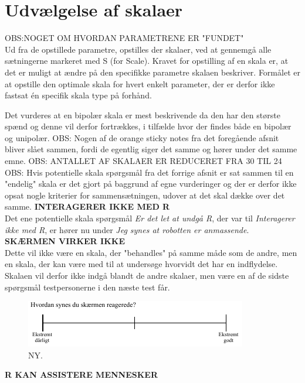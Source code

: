 \section{Udvælgelse af skalaer}
\label{ParametreDatabehandlingSkalaer}
%
OBS:NOGET OM HVORDAN PARAMETRENE ER "FUNDET" \\
Ud fra de opstillede parametre, opstilles der skalaer, ved at gennemgå alle sætningerne markeret med S (for Scale). Kravet for opstilling af en skala er, at det er muligt at ændre på den specifikke parametre skalaen beskriver. Formålet er at opstille den optimale skala for hvert enkelt parameter, der er derfor ikke fastsat én specifik skala type på forhånd. 

Det vurderes at en bipolær skala er mest beskrivende da den har den største spænd og denne vil derfor fortrækkes, i tilfælde hvor der findes både en bipolær og unipolær. \blankline
%
OBS: Nogen af de orange sticky notes fra det foregående afsnit bliver slået sammen, fordi de egentlig siger det samme og hører under det samme emne. \blankline
%
OBS: ANTALLET AF SKALAER ER REDUCERET FRA 30 TIL 24
%
OBS: Hvis potentielle skala spørgsmål fra det forrige afsnit er sat sammen til en "endelig" skala er det gjort på baggrund af egne vurderinger og der er derfor ikke opsat nogle kriterier for sammensætningen, udover at det skal dække over det samme.\blankline
%
\textbf{INTERAGERER IKKE MED R}\\
Det ene potentielle skala spørgsmål \textit{Er det let at undgå R}, der var til \textit{Interagerer ikke med R}, er hører nu under \textit{Jeg synes at robotten er anmassende}.\blankline
%
\textbf{SKÆRMEN VIRKER IKKE}\\
Dette vil ikke være en skala, der "behandles" på samme måde som de andre, men en skala, der kan være med til at undersøge hvorvidt det har en indflydelse. Skalaen vil derfor ikke indgå blandt de andre skalaer, men være en af de sidste spørgsmål testpersonerne i den næste test får. 
%
\begin{figure}[H]
\centering
\includegraphics[width =\textwidth]{Figure/UdvalgteSkalaer/SkaermensReaktion} 
\caption{NY.}
\label{fig:SkalaSkaermensReaktion}
\end{figure}
\noindent
%
\textbf{R KAN ASSISTERE MENNESKER}\\
